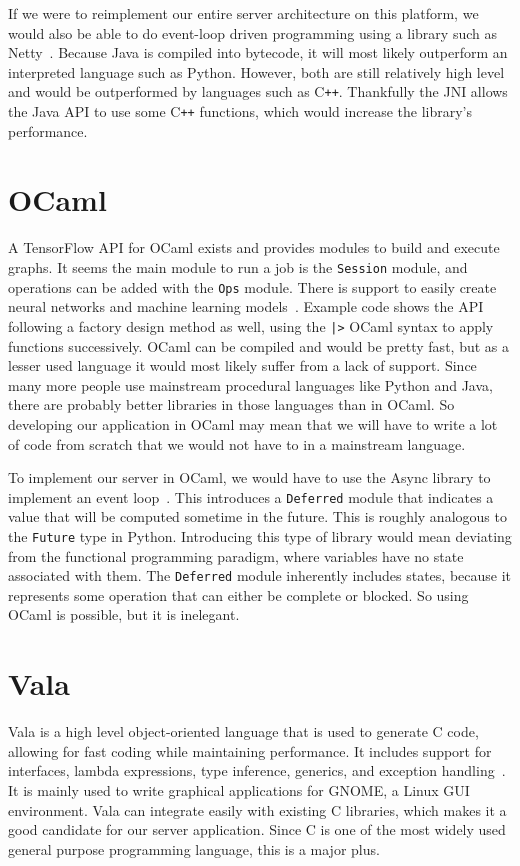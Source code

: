 \documentclass[letterpaper,twocolumn,10pt]{article}
\begin{document}
If we were to reimplement our entire server architecture on this platform, we would also be able to do event-loop driven programming using a library
such as Netty~\cite{nettydocs}. Because Java is compiled into bytecode, it will most likely outperform an interpreted language such as Python. However,
both are still relatively high level and would be outperformed by languages such as C\texttt{++}. Thankfully the JNI allows the Java API to use
some C\texttt{++} functions, which would increase the library's performance. 

\section{OCaml}

A TensorFlow API for OCaml exists and provides modules to build and execute graphs. It seems the main module to run a job is the \texttt{Session} module,
and operations can be added with the \texttt{Ops} module. There is support to easily create neural networks and machine learning models~\cite{ocamlgithub}.
Example code shows the API following a factory design method as well, using the \texttt{|>} OCaml syntax to apply functions successively. OCaml can
be compiled and would be pretty fast, but as a lesser used language it would most likely suffer from a lack of support. Since many more people use mainstream
procedural languages like Python and Java, there are probably better libraries in those languages than in OCaml. So developing our application in OCaml
may mean that we will have to write a lot of code from scratch that we would not have to in a mainstream language.

To implement our server in OCaml, we would have to use the Async library to implement an event loop~\cite{ocamlasync}. This introduces a \texttt{Deferred}
module that indicates a value that will be computed sometime in the future. This is roughly analogous to the \texttt{Future} type in Python. Introducing
this type of library would mean deviating from the functional programming paradigm, where variables have no state associated with them. The
\texttt{Deferred} module inherently includes states, because it represents some operation that can either be complete or blocked. So using OCaml
is possible, but it is inelegant.

\section{Vala}

Vala is a high level object-oriented language that is used to generate C code, allowing for fast coding while maintaining performance.
It includes support for interfaces, lambda expressions, type inference, generics, and exception handling~\cite{valaabout}. It is mainly used to write
graphical applications for GNOME, a Linux GUI environment. Vala can integrate easily with existing C libraries, which makes it a good candidate
for our server application. Since C is one of the most widely used general purpose programming language, this is a major plus. 
\end{document}
